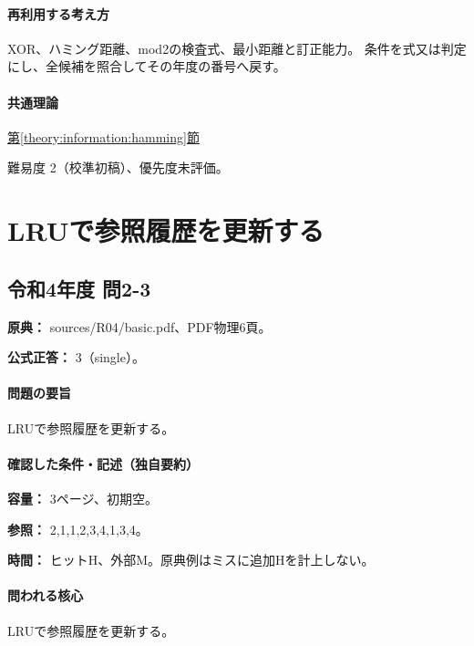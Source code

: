 \paragraph{再利用する考え方} XOR、ハミング距離、mod2の検査式、最小距離と訂正能力。 条件を式又は判定にし、全候補を照合してその年度の番号へ戻す。

\paragraph{共通理論} \hyperref[theory:information:hamming]{第\ref*{theory:information:hamming}節}

\par 難易度 2（校準初稿）、優先度未評価。

\section{LRUで参照履歴を更新する}

\subsection{令和4年度 問2-3}
\label{q:r04-reg-basic-2-3}

\noindent\textbf{原典：} sources/R04/basic.pdf、PDF物理6頁。

\textbf{公式正答：} 3（single）。

\paragraph{問題の要旨} LRUで参照履歴を更新する。

\paragraph{確認した条件・記述（独自要約）}\mbox{}\par

\noindent\textbf{容量：} 3ページ、初期空。\par

\noindent\textbf{参照：} 2,1,1,2,3,4,1,3,4。\par

\noindent\textbf{時間：} ヒットH、外部M。原典例はミスに追加Hを計上しない。\par

\paragraph{問われる核心} LRUで参照履歴を更新する。


